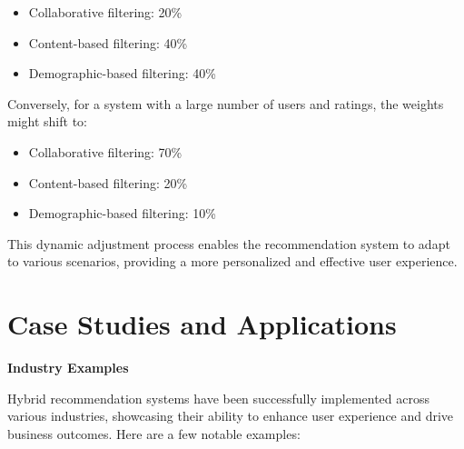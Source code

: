 \documentclass{article}
\begin{document}
\begin{itemize}
    \item Collaborative filtering: 20\%
    \item Content-based filtering: 40\%
    \item Demographic-based filtering: 40\%
\end{itemize}

Conversely, for a system with a large number of users and ratings, the weights might shift to:

\begin{itemize}
    \item Collaborative filtering: 70\%
    \item Content-based filtering: 20\%
    \item Demographic-based filtering: 10\%
\end{itemize}

This dynamic adjustment process enables the recommendation system to adapt to various scenarios, providing a more personalized and effective user experience.

\section{Case Studies and Applications}

\textbf{Industry Examples}

Hybrid recommendation systems have been successfully implemented across various industries, showcasing their ability to enhance user experience and drive business outcomes. Here are a few notable examples:
\end{document}

